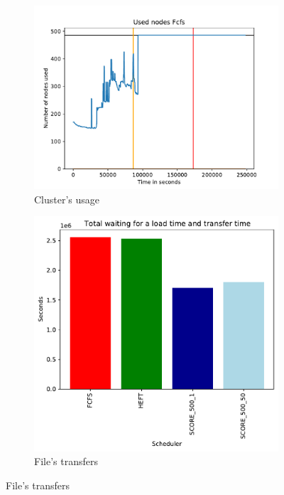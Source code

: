 \documentclass[a4paper]{article}
\begin{document}
\begin{figure}[H]\centering
\begin{subfigure}[b]{0.4\linewidth}\centering\includegraphics[width=1\linewidth]{MBSS/plot/2022-08-16->2022-08-16_V9271_Fcfs_Used_nodes_450_128_32_256_4_1024.pdf}\caption{Cluster's usage}\end{subfigure}
\begin{subfigure}[b]{0.4\linewidth}\centering\includegraphics[width=0.9\linewidth]{MBSS/plot/Results_FCFS_Score_Adaptative_Multiplier_2022-08-16->2022-08-16_V9271_Total_waiting_for_a_load_time_and_transfer_time_450_128_32_256_4_1024.pdf}\caption{File's transfers}\end{subfigure}

\end{figure}
\end{document}
